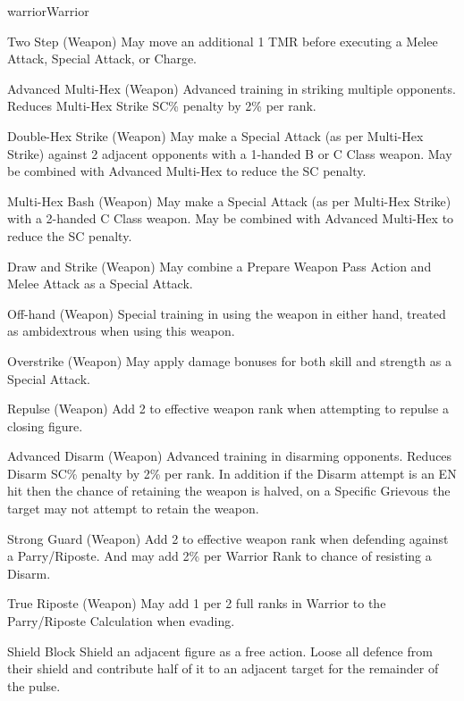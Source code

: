\begin{Skill}[3.0]{warrior}{Warrior}
\begin{Description}
\item[Two Step (Weapon)] May move an additional 1 TMR before executing
  a Melee Attack, Special Attack, or Charge.

\item[Advanced Multi-Hex (Weapon)] Advanced training in striking multiple
opponents. Reduces Multi-Hex Strike SC\% penalty by 2\% per rank.

\item[Double-Hex Strike (Weapon)] May make a Special Attack (as per
  Multi-Hex Strike) against 2 adjacent opponents with a 1-handed B or
  C Class weapon.  May be combined with Advanced Multi-Hex to reduce
  the SC penalty.

\item[Multi-Hex Bash (Weapon)] May make a Special Attack (as per
  Multi-Hex Strike) with a 2-handed C Class weapon.  May be combined
  with Advanced Multi-Hex to reduce the SC penalty.

\item[Draw and Strike (Weapon)] May combine a Prepare Weapon Pass
  Action and Melee Attack as a Special Attack.

\item[Off-hand (Weapon)] Special training in using the weapon in
  either hand, treated as ambidextrous when using this weapon.

\item[Overstrike (Weapon)] May apply damage bonuses for both skill and
  strength as a Special Attack.

\item[Repulse (Weapon)] Add 2 to effective weapon rank when attempting
  to repulse a closing figure.

\item[Advanced Disarm (Weapon)] Advanced training in disarming
  opponents.  Reduces Disarm SC\% penalty by 2\% per rank.  In
  addition if the Disarm attempt is an EN hit then the chance of
  retaining the weapon is halved, on a Specific Grievous the target
  may not attempt to retain the weapon.

\item[Strong Guard (Weapon)] Add 2 to effective weapon rank when
  defending against a Parry/Riposte.  And may add 2\% per Warrior Rank
  to chance of resisting a Disarm.

\item[True Riposte (Weapon)] May add 1 per 2 full ranks in Warrior to
  the Parry/Riposte Calculation when evading.

\item[Shield Block] Shield an adjacent figure as a free action.  Loose
  all defence from their shield and contribute half of it to an
  adjacent target for the remainder of the pulse.


\end{Description}
\end{Skill}
